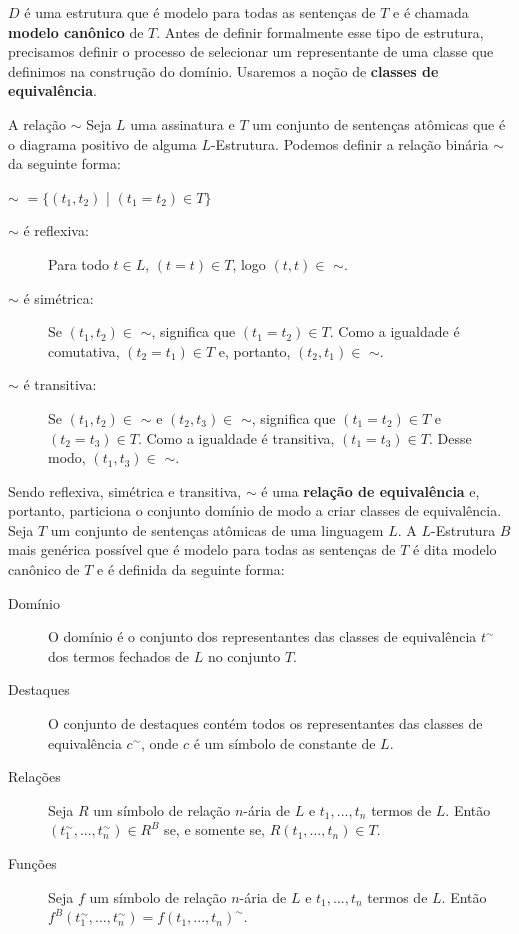 $D$ é uma estrutura que é modelo para todas as sentenças de $T$ e é chamada \textbf{modelo canônico} de $T$. Antes de definir formalmente esse tipo de estrutura, precisamos definir o processo de selecionar um representante de uma classe que definimos na construção do domínio. Usaremos a noção de \textbf{classes de equivalência}. 
\begin{definition}{A relação $\sim$}
    Seja $L$ uma assinatura e $T$ um conjunto de sentenças atômicas que é o diagrama positivo de alguma $L$-Estrutura. Podemos definir a relação binária $\sim$ da seguinte forma:
    \begin{center}
        $\sim$ $= \{(t_1,t_2)$ | $(t_1 = t_2) \in T\}$
    \end{center}
    \begin{description}
        \item[$\sim$ é reflexiva:] Para todo $t \in L$, $(t = t) \in T$, logo $(t,t) \in$ $\sim$.
        \item[$\sim$ é simétrica:] Se $(t_1,t_2) \in$ $\sim$, significa que $(t_1 = t_2) \in T$. Como a igualdade é comutativa, $(t_2 = t_1) \in T$ e, portanto, $(t_2,t_1) \in$ $\sim$.
        \item[$\sim$ é transitiva:] Se $(t_1,t_2) \in$ $\sim$ e $(t_2,t_3) \in$ $\sim$, significa que $(t_1 = t_2) \in T$ e $(t_2 = t_3) \in T$. Como a igualdade é transitiva, $(t_1 = t_3) \in T$. Desse modo, $(t_1,t_3) \in$ $\sim$.
    \end{description}
    Sendo reflexiva, simétrica e transitiva, $\sim$ é uma \textbf{relação de equivalência} e, portanto, particiona o conjunto domínio de modo a criar classes de equivalência.
    Seja $T$ um conjunto de sentenças atômicas de uma linguagem $L$. A $L$-Estrutura $B$ mais genérica possível que é modelo para todas as sentenças de $T$ é dita modelo canônico de $T$ e é definida da seguinte forma:
    \begin{description}
        \item[Domínio] O domínio é o conjunto dos representantes das classes de equivalência $t^\sim$ dos termos fechados de $L$ no conjunto $T$.
        \item[Destaques] O conjunto de destaques contém todos os representantes das classes de equivalência $c^\sim$, onde $c$ é um símbolo de constante de $L$.
        \item[Relações] Seja $R$ um símbolo de relação $n$-ária de $L$ e $t_1,...,t_n$ termos de $L$. Então $(t_1^\sim,...,t_n^\sim) \in R^B$ se, e somente se, $R(t_1,...,t_n) \in T.$
        \item[Funções] Seja $f$ um símbolo de relação $n$-ária de $L$ e $t_1,...,t_n$ termos de $L$. Então $f^B(t_1^\sim,...,t_n^\sim) = f(t_1,...,t_n)^\sim$.
    \end{description}
\end{definition}

